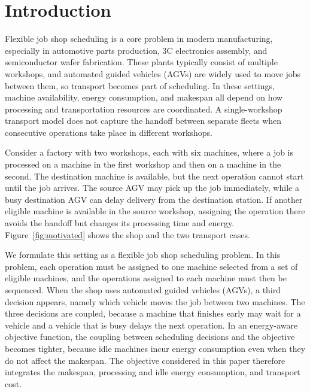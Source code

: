 \section{Introduction}
\label{sec:intro}

Flexible job shop scheduling is a core problem in modern manufacturing,
especially in automotive parts production, 3C electronics assembly, and
semiconductor wafer fabrication. These plants typically consist of multiple
workshops, and automated guided vehicles (AGVs) are widely used to move jobs
between them, so transport becomes part of scheduling. In these settings,
machine availability, energy consumption, and makespan all depend on how
processing and transportation resources are coordinated. A single-workshop transport model does not capture the handoff between separate fleets when consecutive operations take place in different workshops.

Consider a factory with two workshops, each with six machines, where a job is
processed on a machine in the first workshop and then on a machine in the
second. The destination machine is available, but the next operation cannot start until the job arrives. The source AGV may pick up the job immediately, while a busy destination AGV can delay delivery from the destination station. If another eligible machine is available in the source workshop, assigning the operation there avoids the handoff but changes its processing time and energy.
Figure~\ref{fig:motivated} shows the shop and the two transport cases.

We formulate this setting as a flexible job shop scheduling problem. In this problem,
each operation must be assigned to one machine selected from a set of eligible machines,
and the operations assigned to each machine must then be sequenced. When the shop uses automated
guided vehicles (AGVs), a third decision appears, namely which vehicle moves
the job between two machines. The three decisions are coupled, because a
machine that finishes early may wait for a vehicle and a vehicle that is busy
delays the next operation. In an energy-aware objective function, the coupling between scheduling decisions
and the objective becomes tighter, because idle machines incur energy consumption even when
they do not affect the makespan. The objective considered in this paper therefore integrates the makespan,
processing and idle energy consumption, and transport cost.

